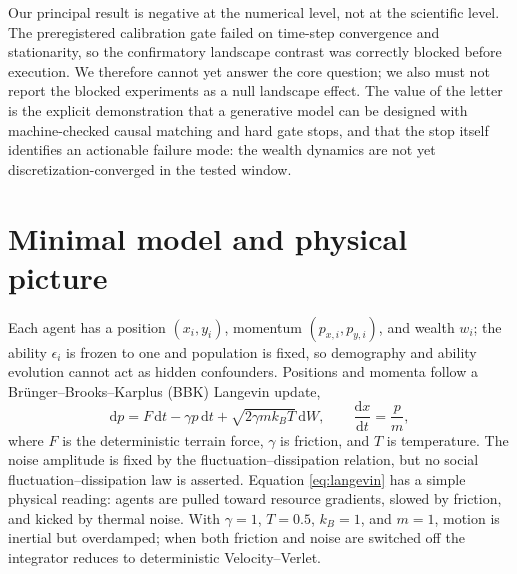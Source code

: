 \documentclass[aps,prl,reprint,superscriptaddress,amsmath,amssymb]{revtex4-2}
\begin{document}
Our principal result is negative at the numerical level, not at the scientific level. The preregistered calibration gate failed on time-step convergence and stationarity, so the confirmatory landscape contrast was correctly blocked before execution. We therefore cannot yet answer the core question; we also must not report the blocked experiments as a null landscape effect. The value of the letter is the explicit demonstration that a generative model can be designed with machine-checked causal matching and hard gate stops, and that the stop itself identifies an actionable failure mode: the wealth dynamics are not yet discretization-converged in the tested window.

\section{Minimal model and physical picture}

Each agent has a position $(x_i,y_i)$, momentum $(p_{x,i},p_{y,i})$, and wealth $w_i$; the ability $\epsilon_i$ is frozen to one and population is fixed, so demography and ability evolution cannot act as hidden confounders. Positions and momenta follow a Br\"unger--Brooks--Karplus (BBK) Langevin update,
\begin{equation}
\mathrm{d}p = F\,\mathrm{d}t-\gamma p\,\mathrm{d}t+\sqrt{2\gamma m k_B T}\,\mathrm{d}W,
\qquad
\frac{\mathrm{d}x}{\mathrm{d}t}=\frac{p}{m},
\label{eq:langevin}
\end{equation}
where $F$ is the deterministic terrain force, $\gamma$ is friction, and $T$ is temperature. The noise amplitude is fixed by the fluctuation--dissipation relation, but no social fluctuation--dissipation law is asserted. Equation \eqref{eq:langevin} has a simple physical reading: agents are pulled toward resource gradients, slowed by friction, and kicked by thermal noise. With $\gamma=1$, $T=0.5$, $k_B=1$, and $m=1$, motion is inertial but overdamped; when both friction and noise are switched off the integrator reduces to deterministic Velocity--Verlet.
\end{document}
